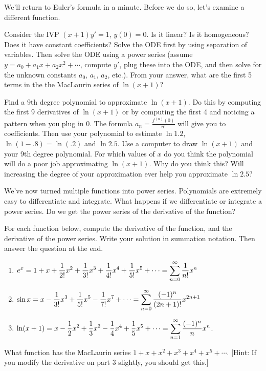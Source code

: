 
We'll return to Euler's formula in a minute.  Before we do so, let's examine a different function. 
\begin{problem}
 Consider the IVP $(x+1)y'=1$, $y(0)=0$.  Is it linear?  Is it homogeneous?  Does it have constant coefficients?  Solve the ODE first by using separation of variables. Then solve the ODE using a power series (assume $y=a_0+a_1x+a_2x^2+\cdots$, compute $y'$, plug these into the ODE, and then solve for the unknown constants $a_0$, $a_1$, $a_2$, etc.). From your answer, what are the first 5 terms in the the MacLaurin series of $\ln(x+1)$?
\end{problem}

\begin{problem}
 Find a 9th degree polynomial to approximate $\ln(x+1)$. Do this by computing the first 9 derivatives of $\ln(x+1)$ or by computing the first 4 and noticing a pattern when you plug in 0. The formula $a_n=\frac{f^{(n)}(0)}{n!}$ will give you to coefficients. 
 Then use your polynomial to estimate $\ln 1.2$, $\ln(1-.8)=\ln(.2)$ and $\ln 2.5$. Use a computer to draw $\ln(x+1)$ and your 9th degree polynomial. For which values of $x$ do you think the polynomial will do a poor job approximating $\ln(x+1)$.  Why do you think this?  Will increasing the degree of your approximation ever help you approximate $\ln 2.5$? 
\end{problem}


We've now turned multiple functions into power series. Polynomials are extremely easy to differentiate and integrate.  What happens if we differentiate or integrate a power series. Do we get the power series of the derivative of the function?
\begin{problem}
 For each function below, compute the derivative of the function, and the derivative of the power series.  Write your solution in summation notation. Then answer the question at the end.
\begin{enumerate}
 \item $\displaystyle e^x = 1+x+\frac{1}{2!}x^2+\frac{1}{3!}x^3+\frac{1}{4!}x^4+\frac{1}{5!}x^5+\cdots =\sum_{n=0}^\infty \frac{1}{n!}x^n$
 \item $\displaystyle \sin x = x-\frac{1}{3!}x^3+\frac{1}{5!}x^5-\frac{1}{7!}x^7+\cdots =\sum_{n=0}^\infty \frac{(-1)^n}{(2n+1)!}x^{2n+1}$
 \item $\displaystyle \ln(x+1) = x-\frac{1}{2}x^2+\frac{1}{3}x^3-\frac{1}{4}x^4+\frac{1}{5}x^5+\cdots = \sum_{n=1}^\infty \frac{(-1)^n}{n}x^{n}$.  
\end{enumerate}
What function has the MacLaurin series $1+x+x^2+x^3+x^4+x^5+\cdots$. [Hint: If you modify the derivative on part 3 slightly, you should get this.]
\end{problem}


